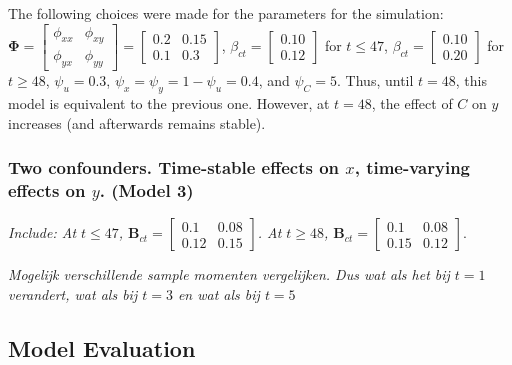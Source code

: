 \documentclass[
]{interact}
\begin{document}
The following choices were made for the parameters for the simulation:
\(\boldsymbol{\Phi} = \begin{bmatrix} \phi_{xx} & \phi_{xy}\\ \phi_{yx} & \phi_{yy} \end{bmatrix} = \begin{bmatrix} 0.2 & 0.15\\ 0.1 & 0.3 \end{bmatrix}\),
\(\beta_{ct} = \begin{bmatrix} 0.10\\0.12 \end{bmatrix}\) for
\(t \le 47\), \(\beta_{ct} = \begin{bmatrix} 0.10\\0.20 \end{bmatrix}\)
for \(t \ge 48\), \(\psi_u = 0.3\),
\(\psi_x = \psi_y = 1 - \psi_u = 0.4\), and \(\psi_C = 5\). Thus, until
\(t = 48\), this model is equivalent to the previous one. However, at
\(t = 48\), the effect of \(C\) on \(y\) increases (and afterwards
remains stable).

\hypertarget{two-confounders.-time-stable-effects-on-x-time-varying-effects-on-y.-model-3}{%
\subsubsection{\texorpdfstring{Two confounders. Time-stable effects on
\(x\), time-varying effects on \(y\). (Model
3)}{Two confounders. Time-stable effects on x, time-varying effects on y. (Model 3)}}\label{two-confounders.-time-stable-effects-on-x-time-varying-effects-on-y.-model-3}}

\emph{Include: At \(t \le 47\),
\(\textbf{B}_{ct} = \begin{bmatrix} 0.1 & 0.08\\ 0.12 & 0.15 \end{bmatrix}\).
At \(t \ge 48\),
\(\textbf{B}_{ct} = \begin{bmatrix} 0.1 & 0.08\\ 0.15 & 0.12 \end{bmatrix}.\)}

\emph{Mogelijk verschillende sample momenten vergelijken. Dus wat als
het bij \(t = 1\) verandert, wat als bij \(t=3\) en wat als bij \(t=5\)}

\hypertarget{model-evaluation}{%
\subsection{Model Evaluation}\label{model-evaluation}}
\end{document}
